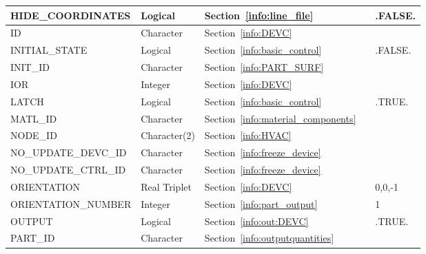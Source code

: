 \documentclass[11pt]{book}
\begin{document}
\begin{longtable}{@{\extracolsep{\fill}}|l|l|l|l|l|}
{\ct HIDE\_COORDINATES}     & Logical         & Section~\ref{info:line_file}                                    &       & {\ct .FALSE.} \\ \hline
{\ct ID}                    & Character       & Section~\ref{info:DEVC}                                         &       &               \\ \hline
{\ct INITIAL\_STATE}        & Logical         & Section~\ref{info:basic_control}                                &       & {\ct .FALSE.} \\ \hline
{\ct INIT\_ID}              & Character       & Section~\ref{info:PART_SURF}                                    &       &               \\ \hline
{\ct IOR}                   & Integer         & Section~\ref{info:DEVC}                                         &       &               \\ \hline
{\ct LATCH}                 & Logical         & Section~\ref{info:basic_control}                                &       & {\ct .TRUE.}  \\ \hline
{\ct MATL\_ID}              & Character       & Section~\ref{info:material_components}                          &       &               \\ \hline
{\ct NODE\_ID}              & Character(2)    & Section~\ref{info:HVAC}                                         &       &               \\ \hline
{\ct NO\_UPDATE\_DEVC\_ID}  & Character       & Section~\ref{info:freeze_device}                                &       &               \\ \hline
{\ct NO\_UPDATE\_CTRL\_ID}  & Character       & Section~\ref{info:freeze_device}                                &       &               \\ \hline
{\ct ORIENTATION}           & Real Triplet    & Section~\ref{info:DEVC}                                         &       & 0,0,-1        \\ \hline
{\ct ORIENTATION\_NUMBER}   & Integer         & Section~\ref{info:part_output}                                  &       & 1             \\ \hline
{\ct OUTPUT}                & Logical         & Section~\ref{info:out:DEVC}                                     &       & {\ct .TRUE.}  \\ \hline
{\ct PART\_ID}              & Character       & Section~\ref{info:outputquantities}                             &       &               \\ \hline

\end{longtable}
\end{document}
